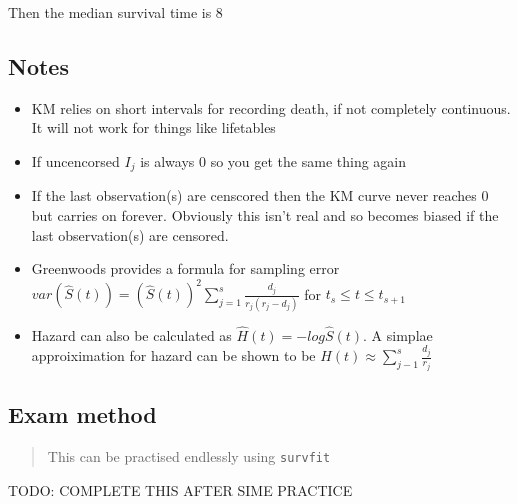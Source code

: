 \documentclass[
  letterpaper,
  DIV=11,
  numbers=noendperiod]{scrreprt}
\providecommand{\tightlist}{%
  \setlength{\itemsep}{0pt}\setlength{\parskip}{0pt}}\usepackage{longtable,booktabs,array}
\begin{document}
Then the median survival time is 8

\hypertarget{notes-1}{%
\subsection{Notes}\label{notes-1}}

\begin{itemize}
\tightlist
\item
  KM relies on short intervals for recording death, if not completely
  continuous. It will not work for things like lifetables
\item
  If uncencorsed \(I_j\) is always 0 so you get the same thing again
\item
  If the last observation(s) are censcored then the KM curve never
  reaches 0 but carries on forever. Obviously this isn't real and so
  becomes biased if the last observation(s) are censored.
\item
  Greenwoods provides a formula for sampling error
  \(var(\hat{S}(t)) = (\hat{S}(t))^2 \sum^s_{j=1} \frac{d_j}{r_j(r_j - d_j)}\)
  for \(t_s\leq t \leq t_{s+1}\)
\item
  Hazard can also be calculated as \(\hat{H}(t) = -log\hat{S}(t)\). A
  simplae approiximation for hazard can be shown to be
  \(H(t) \approx \sum_{j-1}^s\frac{d_j}{r_j}\)
\end{itemize}

\hypertarget{exam-method}{%
\subsection{Exam method}\label{exam-method}}

\begin{quote}
This can be practised endlessly using \texttt{survfit}
\end{quote}

TODO: COMPLETE THIS AFTER SIME PRACTICE
\end{document}
